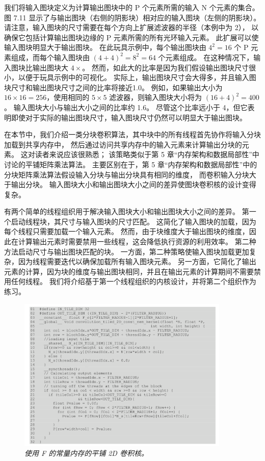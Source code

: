 我们将输入图块定义为计算输出图块中的 P 个元素所需的输入 N 个元素的集合。 
图 7.11 显示了与输出图块（右侧的阴影块）相对应的输入图块（左侧的阴影块）。 
请注意，输入图块的尺寸需要在每个方向上扩展滤波器的半径（本例中为 2），
以确保它包括计算输出图块边缘的 P 元素所需的所有光环输入元素。 
此扩展可以使输入图块明显大于输出图块。 
在此玩具示例中，每个输出图块由 $4^2 = 16$ 个 P 元素组成，而每个输入图块由 $(4 + 4)^2 = 8^2 = 64$ 个元素组成。 
在这种情况下，输入图块比输出图块大 $4\times$。 然而，如此大的比率是因为我们假设输出图块尺寸很小，以便于玩具示例中的可视化。 
实际上，输出图块尺寸会大得多，并且输入图块尺寸和输出图块尺寸之间的比率将接近1.0。 
例如，如果输出大小为 $16 \times 16 = 256$，使用相同的 $5 \times 5$ 滤波器，则输入图块大小将为 $(16 + 4)^2 = 400$。
输入图块大小与输出大小之间的比率约 1.6。 
尽管这个比率远小于 4，但它表明即使对于实际的输出图块尺寸，输入图块尺寸仍然可以明显大于输出图块。

在本节中，我们介绍一类分块卷积算法，其中块中的所有线程首先协作将输入分块加载到共享内存中，
然后通过访问共享内存中的输入元素来计算输出分块的元素。 
这对读者来说应该很熟悉； 该策略类似于第 5 章“内存架构和数据局部性”中讨论的平铺矩阵乘法算法。 
主要区别在于，第 5 章“内存架构和数据局部性”中的分块矩阵乘法算法假设输入分块与输出分块具有相同的维度，
而卷积输入分块大于输出分块。 输入图块大小和输出图块大小之间的差异使图块卷积核的设计变得复杂。

有两个简单的线程组织用于解决输入图块大小和输出图块大小之间的差异。 
第一个启动线程块，其尺寸与输入图块的尺寸匹配。 这简化了输入图块的加载，因为每个线程只需要加载一个输入元素。 
然而，由于块维度大于输出图块的维度，因此在计算输出元素时需要禁用一些线程，这会降低执行资源的利用效率。 
第二种方法启动尺寸与输出图块匹配的块。 
一方面，第二种策略使输入图块加载更加复杂，因为线程需要迭代以确保加载所有输入图块元素。 
另一方面，它简化了输出元素的计算，因为块的维度与输出图块相同，并且在输出元素的计算期间不需要禁用任何线程。 
我们将介绍基于第一个线程组织的内核设计，并将第二个组织作为练习。

\begin{figure}[H]
	\centering
	\includegraphics[width=0.9\textwidth]{figs/F7.12.png}
	\caption{\textit{使用 F 的常量内存的平铺 2D 卷积核。}}
\end{figure}

